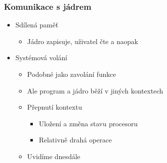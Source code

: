\begin{frame}
  \frametitle{Komunikace s jádrem}

  \begin{itemize}
    \item Sdílená paměť
    \begin{itemize}
      \item Jádro zapisuje, uživatel čte a naopak
    \end{itemize}

    \pause

    \item Systémová volání
    \begin{itemize}
      \item Podobné jako zavolání funkce
      \item Ale program a jádro běží v jiných kontextech

      \pause

      \item Přepnutí kontextu
      \begin{itemize}
	\item Uložení a změna stavu procesoru
	\item Relativně drahá operace
      \end{itemize}

      \pause

      \item Uvidíme \iffimuni dnes\fi dále
    \end{itemize}

  \end{itemize}

\end{frame}

